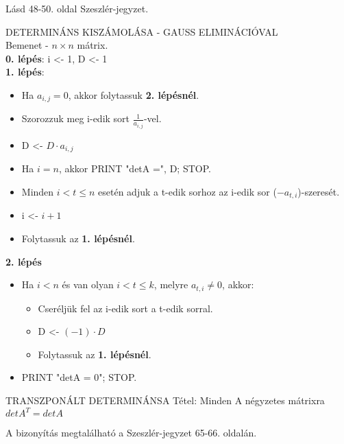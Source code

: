 \begin{leftbar}
Lásd 48-50. oldal Szeszlér-jegyzet.
\end{leftbar}
\begin{tetel}{
DETERMINÁNS KISZÁMOLÁSA -  GAUSS ELIMINÁCIÓVAL\\
Bemenet - $n\times n$ mátrix}.\\
\textbf{0. lépés}: i <- 1, D <- 1\\
\textbf{1. lépés}:
\begin{itemize}
\item Ha $a_{i,j} = 0$, akkor folytassuk \textbf{2. lépésnél}.
\item Szorozzuk meg i-edik sort $\frac{1}{a_{i,j}}$-vel.
\item D <- $D \cdot a_{i,j}$
\item Ha $i = n$, akkor PRINT "detA =", D; STOP.
\item Minden $i < t \leq n$ esetén adjuk a t-edik sorhoz az i-edik sor ($-a_{t,i}$)-szeresét.
\item i <- $i+1$
\item Folytassuk az \textbf{1. lépésnél}.
\end{itemize}
\textbf{2. lépés}
\begin{itemize}
\item Ha $i < n$ és van olyan $i < t \leq k$, melyre $a_{t,i} \neq 0$, akkor:
\begin{itemize}
\item Cseréljük fel az i-edik sort a t-edik sorral.
\item D <- $(-1)\cdot D$
\item Folytassuk az \textbf{1. lépésnél}.
\end{itemize}
\item PRINT "detA = 0"; STOP.
\end{itemize}
\end{tetel}
\begin{tetel}{
TRANSZPONÁLT DETERMINÁNSA Tétel}: Minden A négyzetes mátrixra $detA^T = detA$
\end{tetel}
\begin{leftbar}
A bizonyítás megtalálható a Szeszlér-jegyzet 65-66. oldalán.
\end{leftbar}
